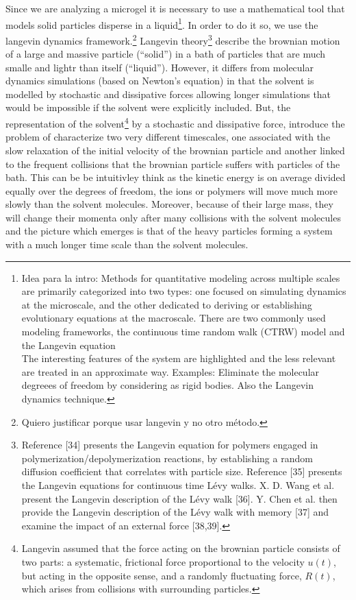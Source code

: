 \documentclass[../../main-notes.tex]{subfiles}
\begin{document}
Since we are analyzing a microgel it is necessary to use a mathematical tool that models solid particles disperse in a liquid\footnote{Idea para la intro: Methods for quantitative modeling across multiple scales are primarily categorized into two types: one focused on simulating dynamics at the microscale, and the other dedicated to deriving or establishing evolutionary equations at the macroscale.
There are two commonly used modeling frameworks, the continuous time random walk (CTRW) model and the Langevin equation\citep{wangMultiscaleModelingSimulation2025}\\ The interesting features of the system are highlighted and the less relevant are treated in an approximate way.
Examples: Eliminate the molecular degreees of freedom by considering as rigid bodies.
Also the Langevin dynamics technique.
}.
In order to do it so, we use the langevin dynamics framework.\footnote{Quiero justificar porque usar langevin y no otro método.}
Langevin theory\footnote{Reference [34] presents the Langevin equation for polymers engaged in polymerization/depolymerization reactions, by establishing a random diffusion coefficient that correlates with particle size. Reference [35] presents the Langevin equations for continuous time Lévy walks. X. D. Wang et al. present the Langevin description of the Lévy walk [36]. Y. Chen et al. then provide the Langevin description of the Lévy walk with memory [37] and examine the impact of an external force [38,39]\citep{wangMultiscaleModelingSimulation2025}.
} describe the brownian motion of a large and massive particle (``solid'') in a bath of particles that are much smalle and lightr than itself (``liquid'')\citep{tsl2006}.
However, it differs from molecular dynamics simulations (based on Newton's equation) in that the solvent is modelled by stochastic and dissipative forces allowing longer simulations that would be impossible if the solvent were explicitly included\citep{pastorTechniquesApplicationsLangevin1994}. 
But, the representation of the solvent\footnote{Langevin assumed that the force acting on the brownian particle consists of two parts: a systematic, frictional force proportional to the velocity $u(t)$, but acting in the opposite sense, and a randomly fluctuating force, $R(t)$, which arises from collisions with surrounding particles\citep{tsl2006}.

} by a stochastic and dissipative force, introduce the problem of characterize two very different timescales, one associated with the slow relaxation of the initial velocity of the brownian particle and another linked to the frequent collisions that the brownian particle suffers with particles of the bath\citep{tsl2006}. 
This can be be intuitivley think as the kinetic energy is on average divided equally over the degrees of freedom, the ions or polymers will move much more slowly than the solvent molecules\citep{Thijssen2007}.
Moreover, because of their large mass, they will change their momenta only after many collisions with the solvent molecules and the picture which emerges is that of the heavy particles forming a system with a much longer time scale than the solvent molecules\citep{Thijssen2007}.
\end{document}
